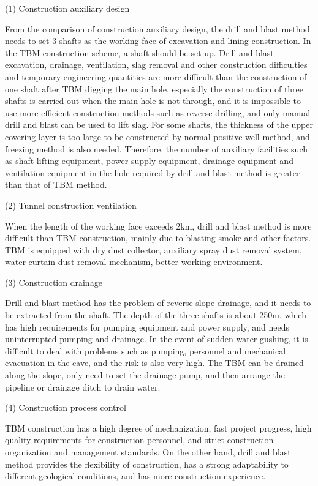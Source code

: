 \documentclass[11pt]{article}
\begin{document}
(1) Construction auxiliary design

From the comparison of construction auxiliary design, the drill and blast method needs to set 3 shafts as the working face of excavation and lining construction. In the TBM construction scheme, a shaft should be set up. Drill and blast excavation, drainage, ventilation, slag removal and other construction difficulties and temporary engineering quantities are more difficult than the construction of one shaft after TBM digging the main hole, especially the construction of three shafts is carried out when the main hole is not through, and it is impossible to use more efficient construction methods such as reverse drilling, and only manual drill and blast can be used to lift slag. For some shafts, the thickness of the upper covering layer is too large to be constructed by normal positive well method, and freezing method is also needed. Therefore, the number of auxiliary facilities such as shaft lifting equipment, power supply equipment, drainage equipment and ventilation equipment in the hole required by drill and blast method is greater than that of TBM method.

(2) Tunnel construction ventilation

When the length of the working face exceeds 2km, drill and blast method is more difficult than TBM construction, mainly due to blasting smoke and other factors. TBM is equipped with dry dust collector, auxiliary spray dust removal system, water curtain dust removal mechanism, better working environment.

(3)	Construction drainage

Drill and blast method has the problem of reverse slope drainage, and it needs to be extracted from the shaft. The depth of the three shafts is about 250m, which has high requirements for pumping equipment and power supply, and needs uninterrupted pumping and drainage. In the event of sudden water gushing, it is difficult to deal with problems such as pumping, personnel and mechanical evacuation in the cave, and the risk is also very high. The TBM can be drained along the slope, only need to set the drainage pump, and then arrange the pipeline or drainage ditch to drain water.

(4)	Construction process control

TBM construction has a high degree of mechanization, fast project progress, high quality requirements for construction personnel, and strict construction organization and management standards. On the other hand, drill and blast method provides the flexibility of construction, has a strong adaptability to different geological conditions, and has more construction experience.
\end{document}
